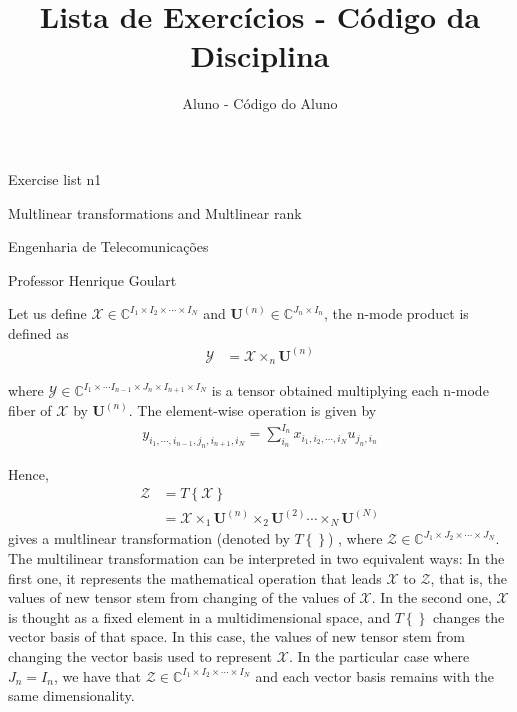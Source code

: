\documentclass[12pt,a4paper]{article}
\author{Aluno - Código do Aluno}
\title{Lista de Exercícios - Código da Disciplina}
\date{}
\newcommand{\Complex}{\mathbb{C}}
\begin{document}
	\begin{center}
    {\huge Exercise list n1\par}
    {\LARGE Multlinear transformations and Multlinear rank \par}
    {\Large Engenharia de Telecomunicações \par}
    {\Large Professor Henrique Goulart \par}
    \end{center}

\problem \label{probone}

Let us define \(\mathcal{X} \in \Complex^{I_1 \times I_2 \times \cdots \times I_N}\) and \(\mathbf{U}^{(n)} \in \Complex^{J_n\times I_n}\), the n-mode product is defined as
\begin{align}
    \label{eq:n-mode-prod}
    \mathcal{Y} & = \mathcal{X}\times_n \mathbf{U}^{(n)}
\end{align}

where \(\mathcal{Y} \in \Complex^{I_1 \times \cdots I_{n-1} \times J_{n} \times I_{n+1} \times I_N}\) is a tensor obtained multiplying each n-mode fiber of \(\mathcal{X}\) by $\mathbf{U}^{(n)}$. The element-wise operation is given by
\begin{align}
    y_{i_1, \cdots, i_{n-1}, j_{n}, i_{n+1}, i_N} = \sum_{i_n}^{I_n} x_{i_1, i_2, \cdots, i_N} u_{j_n, i_n}
\end{align}

Hence,
\begin{align}
    \mathcal{Z} & = T\left\{\mathcal{X}\right\} \\
    & = \mathcal{X}\times_1 \mathbf{U}^{(n)}\times_2 \mathbf{U}^{(2)} \cdots \times_N \mathbf{U}^{(N)}
\end{align}
gives a multlinear transformation (denoted by $T\left\{\right\}$) , where $\mathcal{Z} \in \Complex^{J_1 \times J_2 \times \cdots \times J_N}$. The multilinear transformation can be interpreted in two equivalent ways: In the first one, it represents the mathematical operation that leads \(\mathcal{X}\) to \(\mathcal{Z}\), that is, the values of new tensor stem from changing of the values of \(\mathcal{X}\). In the second one, \(\mathcal{X}\) is thought as a fixed element in a multidimensional space, and $T\left\{\right\}$ changes the vector basis of that space. In this case, the values of new tensor stem from changing the vector basis used to represent \(\mathcal{X}\). In the particular case where \(J_n = I_n\), we have that \(\mathcal{Z} \in \Complex^{I_1 \times I_2 \times \cdots \times I_N}\) and each vector basis remains with the same dimensionality.
\end{document}
